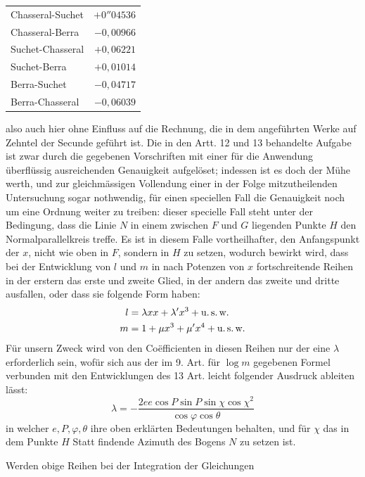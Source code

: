 %
\begin{center}
\begin{tabular}{lr}
Chasseral-Suchet&\(+0''04536\)\\
Chasseral-Berra&\(-0{,}00966\)\\
Suchet-Chasseral&\(+0{,}06221\)\\
Suchet-Berra&\(+0{,}01014\)\\
Berra-Suchet&\(-0{,}04717\)\\
Berra-Chasseral&\(-0{,}06039\)
\end{tabular}
\end{center}
also auch hier ohne Einfluss auf die Rechnung, die in dem angeführten Werke auf Zehntel der Secunde geführt ist.
Die in den Artt. 12 und 13 behandelte Aufgabe ist zwar durch die gegebenen Vorschriften mit einer für die Anwendung überflüssig ausreichenden Genauigkeit aufgelöset; indessen ist es doch der Mühe werth, und zur gleichmässigen Vollendung einer in der Folge mitzutheilenden Untersuchung sogar nothwendig, für einen speciellen Fall die Genauigkeit noch um eine Ordnung weiter zu treiben: dieser specielle Fall steht unter der Bedingung, dass die Linie \(N\) in einem zwischen \(F\) und \(G\) liegenden Punkte \(H\) den Normalparallelkreis treffe. Es ist in diesem Falle vortheilhafter, den Anfangspunkt der \(x\), nicht wie oben in \(F\), sondern in \(H\) zu setzen, wodurch bewirkt wird, dass bei der Entwicklung von \(l\) und \(m\) in nach Potenzen von \(x\) fortschreitende Reihen in der erstern das erste und zweite Glied, in der andern das zweite und dritte ausfallen, oder dass sie folgende Form haben:
\[
\begin{aligned}
l&=\lambda xx+\lambda'x^3+\text{u.\,s.\,w.}\\
m&=1+\mu x^3+\mu'x^4+\text{u.\,s.\,w.}
\end{aligned}
\]
\indent Für unsern Zweck wird von den Coëfficienten in diesen Reihen nur der eine \(\lambda\) erforderlich sein, wofür sich aus der im 9. Art. für \(\log m\) gegebenen Formel verbunden mit den Entwicklungen des 13 Art. leicht folgender Ausdruck ableiten lässt:
\[
\lambda=-\frac{2ee\cos P\sin P\sin\chi\cos\chi^2}{\cos\varphi\cos\theta}
\]
in welcher \(e,P,\varphi,\theta\) ihre oben erklärten Bedeutungen behalten, und für \(\chi\) das in dem Punkte \(H\) Statt findende Azimuth des Bogens \(N\) zu setzen ist.

Werden obige Reihen bei der Integration der Gleichungen
